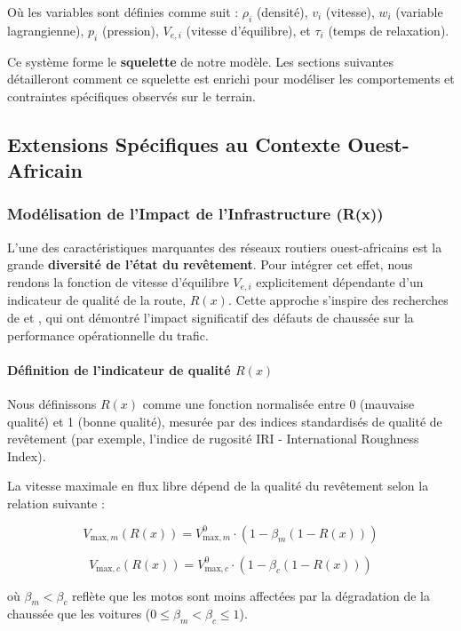 Où les variables sont définies comme suit : $\rho_i$ (densité), $v_i$ (vitesse), $w_i$ (variable lagrangienne), $p_i$ (pression), $V_{e,i}$ (vitesse d'équilibre), et $\tau_i$ (temps de relaxation).

Ce système forme le \textbf{squelette} de notre modèle. Les sections suivantes détailleront comment ce squelette est enrichi pour modéliser les comportements et contraintes spécifiques observés sur le terrain.

\subsection{Extensions Spécifiques au Contexte Ouest-Africain}
\subsubsection{Modélisation de l'Impact de l'Infrastructure (R(x))}
L'une des caractéristiques marquantes des réseaux routiers ouest-africains est la grande \textbf{diversité de l'état du revêtement}. Pour intégrer cet effet, nous rendons la fonction de vitesse d'équilibre $V_{e,i}$ explicitement dépendante d'un indicateur de qualité de la route, $R(x)$. Cette approche s'inspire des recherches de \cite{Hussein2023} et \cite{Kocatepe2019}, qui ont démontré l'impact significatif des défauts de chaussée sur la performance opérationnelle du trafic.

\paragraph{Définition de l'indicateur de qualité $R(x)$}
Nous définissons $R(x)$ comme une fonction normalisée entre 0 (mauvaise qualité) et 1 (bonne qualité), mesurée par des indices standardisés de qualité de revêtement (par exemple, l'indice de rugosité IRI - International Roughness Index).

La vitesse maximale en flux libre dépend de la qualité du revêtement selon la relation suivante :

\begin{equation}
    V_{\text{max},m}(R(x)) = V_{\text{max},m}^0 \cdot \left(1 - \beta_m (1 - R(x))\right)
\end{equation}

\begin{equation}
    V_{\text{max},c}(R(x)) = V_{\text{max},c}^0 \cdot \left(1 - \beta_c (1 - R(x))\right)
\end{equation}

où $\beta_m < \beta_c$ reflète que les motos sont moins affectées par la dégradation de la chaussée que les voitures ($0 \leq \beta_m < \beta_c \leq 1$).

